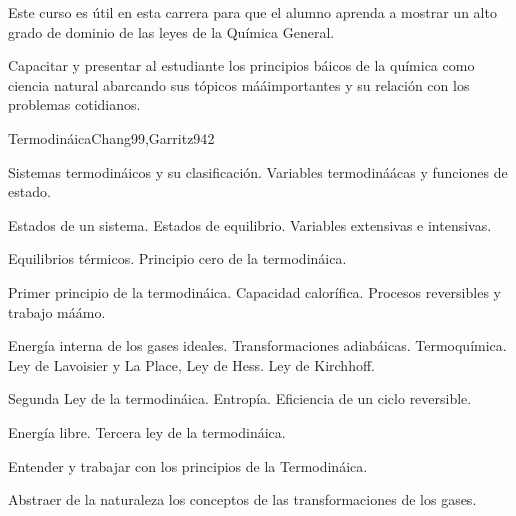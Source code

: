 \begin{syllabus}


\begin{justification}
Este curso es útil en esta carrera para que el alumno aprenda a mostrar un alto grado de dominio de las leyes de la Química General.
\end{justification}

\begin{goals}
\item Capacitar y presentar al estudiante los principios báicos de la química como ciencia natural abarcando sus tópicos mááimportantes y su relación con los problemas cotidianos.
\end{goals}

\begin{outcomes}
\end{outcomes}

\begin{unit}{Termodináica}{Chang99,Garritz94}{2}
\begin{topics}
	\item Sistemas termodináicos y su clasificación. Variables termodináácas y funciones de estado.
	\item Estados de un sistema. Estados de equilibrio. Variables extensivas e intensivas.
	\item Equilibrios térmicos. Principio cero de la termodináica.
	\item Primer principio de la termodináica. Capacidad calorífica. Procesos reversibles y trabajo máámo.
	\item Energía interna de los gases ideales. Transformaciones adiabáicas. Termoquímica. Ley de Lavoisier y La Place, Ley de Hess. Ley de Kirchhoff.
	\item Segunda Ley de la termodináica. Entropía. Eficiencia de un ciclo reversible.
	\item Energía libre. Tercera ley de la termodináica.
\end{topics}

\begin{unitgoals}
	\item Entender y trabajar con los principios de la Termodináica.
	\item Abstraer de la naturaleza los conceptos de las transformaciones de los gases.
\end{unitgoals}
\end{unit}


\end{syllabus}
